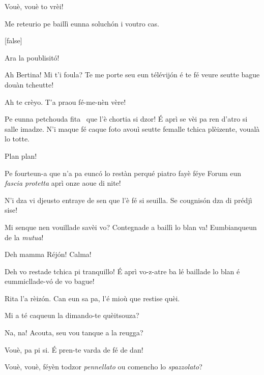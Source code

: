 \begin{drama}
\Pascalspeaks {} Vouè, vouè to vrèi!

\DzeudzoSenliquerspeaks Me reteurio pe baillì eunna soluchón i voutro cas.

[false]



\Ritaspeaks {} Ara la poublisitó!


\Tobiespeaks {} Ah Bertina! Mi t'i foula? Te me porte seu eun télévij\'on é te fé veure seutte bague douàn tcheutte!

\Bertinaspeaks {} Ah te crèyo. T’a praou fé-me-nèn vère! 

\Tobiespeaks Pe eunna petchouda fita \fitaa\ que l’è chortia si dzor! É aprì se vèi pa ren d’atro si salle imadze. N’i maque fé caque foto avouì seutte femalle tchica plèizente, voualà lo totte.

\Pascalspeaks {} Plan plan!

\Bertinaspeaks Pe fourteun-a que n’a pa eunc\'o lo restàn perqué piatro fayè féye Forum eun \textit{fascia protetta} aprì onze aoue di nite!

\Eumprezeospeaks N’i dza vi djeusto entraye de sen que l’è fé si seuilla. Se cougnisón dza di prédjì sise!

\Tobiespeaks Mi senque nen vouillade savèi vo? Contegnade a baillì lo blan va! Eumbianqueun de la \textit{mutua}!

\Simonspeaks Deh mamma Réjón! Calma!

\Ritaspeaks {} Deh vo restade tchica pi tranquillo!  É aprì vo-z-atre ba lé baillade lo blan é eum\-mi\-clla\-de-vó de vo bague!

\Simonspeaks Rita l’a rèizón. Can eun sa pa, l’é mioù que restise quèi.

\Eumprezeospeaks Mi a té caqueun la dimando-te quèitsouza?

\Simonspeaks Na, na! Acouta, seu vou tanque a la reugga?

\Eumprezeospeaks Vouè, pa pi si. É pren-te varda de fé de dan!

\Simonspeaks Vouè, vouè, féyèn todzor \textit{pennellato} ou comencho lo \textit{spazzolato}?


\end{drama}
